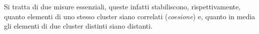 \documentclass{subfiles}
\begin{document}
Si tratta di due misure essenziali, queste infatti stabiliscono, rispettivamente,
quanto elementi di uno stesso cluster siano correlati (\emph{coesione}) e,
quanto in media gli elementi di due cluster distinti siano distanti.
\end{document}
